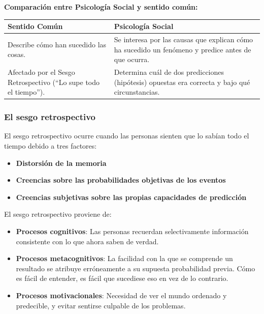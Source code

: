 \documentclass[
]{website}
\begin{document}
\textbf{Comparación entre Psicología Social y sentido común:}

\begin{longtable}[]{@{}
  >{\raggedright\arraybackslash}p{}
  >{\raggedright\arraybackslash}p{}@{}}
\toprule\noalign{}
\begin{minipage}[b]{\linewidth}\raggedright
Sentido Común
\end{minipage} & \begin{minipage}[b]{\linewidth}\raggedright
Psicología Social
\end{minipage} \\
\midrule\noalign{}
\endhead
\bottomrule\noalign{}
\endlastfoot
Describe cómo han sucedido las cosas. & Se interesa por las causas que explican cómo ha sucedido un fenómeno y predice antes de que ocurra. \\
Afectado por el Sesgo Retrospectivo (``Lo supe todo el tiempo''). & Determina cuál de dos predicciones (hipótesis) opuestas era correcta y bajo qué circunstancias. \\
\end{longtable}

\subsubsection*{El sesgo retrospectivo}\label{subtema1_5_1}

El sesgo retrospectivo ocurre cuando las personas sienten que lo sabían todo el tiempo debido a tres factores:

\begin{itemize}
\item
  \textbf{Distorsión de la memoria}
\item
  \textbf{Creencias sobre las probabilidades objetivas de los eventos}
\item
  \textbf{Creencias subjetivas sobre las propias capacidades de predicción}
\end{itemize}

El sesgo retrospectivo proviene de:

\begin{itemize}
\item
  \textbf{Procesos cognitivos}: Las personas recuerdan selectivamente información consistente con lo que ahora saben de verdad.
\item
  \textbf{Procesos metacognitivos}: La facilidad con la que se comprende un resultado se atribuye erróneamente a su supuesta probabilidad previa. Cómo es fácil de entender, es fácil que sucediese eso en vez de lo contrario.
\item
  \textbf{Procesos motivacionales}: Necesidad de ver el mundo ordenado y predecible, y evitar sentirse culpable de los problemas.
\end{itemize}
\end{document}
